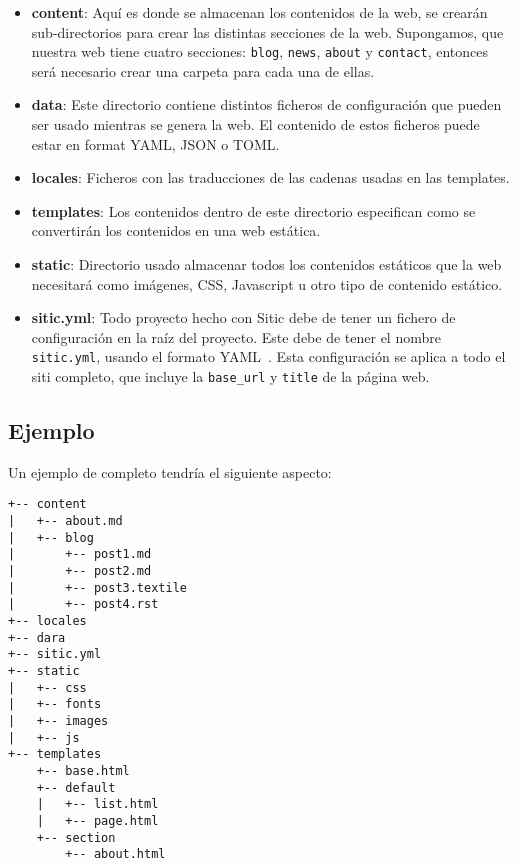 \begin{itemize}
    \item \textbf{content}: Aquí es donde se almacenan los contenidos de la web, se crearán
        sub-directorios para crear las distintas secciones de la web. Supongamos, que nuestra web
        tiene cuatro secciones: \texttt{blog}, \texttt{news}, \texttt{about} y \texttt{contact},
        entonces será necesario crear una carpeta para cada una de ellas.
    \item \textbf{data}: Este directorio contiene distintos ficheros de configuración que pueden
        ser usado mientras se genera la web. El contenido de estos ficheros puede estar en format
        YAML, JSON o TOML.
    \item \textbf{locales}: Ficheros con las traducciones de las cadenas usadas en las templates.
    \item \textbf{templates}: Los contenidos dentro de este directorio especifican como se convertirán
        los contenidos en una web estática.
    \item \textbf{static}: Directorio usado almacenar todos los contenidos estáticos que la web
        necesitará como imágenes, CSS, Javascript u otro tipo de contenido estático.
    \item \textbf{sitic.yml}: Todo proyecto hecho con Sitic debe de tener un fichero
        de configuración en la raíz del proyecto. Este debe de tener el nombre \texttt{sitic.yml},
        usando el formato YAML~\cite{yaml}. Esta configuración se aplica a todo el siti completo,
        que incluye la \texttt{base\_url} y \texttt{title} de la página web.
\end{itemize}

\subsection{Ejemplo}
Un ejemplo de completo tendría el siguiente aspecto:

\begin{verbatim}
+-- content
|   +-- about.md
|   +-- blog
|       +-- post1.md
|       +-- post2.md
|       +-- post3.textile
|       +-- post4.rst
+-- locales
+-- dara
+-- sitic.yml
+-- static
|   +-- css
|   +-- fonts
|   +-- images
|   +-- js
+-- templates
    +-- base.html
    +-- default
    |   +-- list.html
    |   +-- page.html
    +-- section
        +-- about.html
\end{verbatim}


